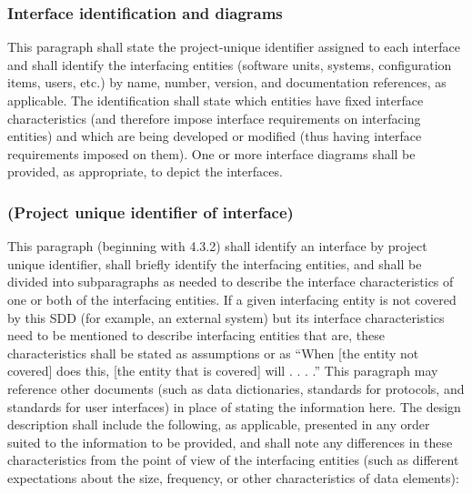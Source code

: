 \documentclass{fidata-report-template}
\begin{document}
\subsubsection{Interface identification and diagrams}

This paragraph shall state the project-unique identifier assigned to
each interface and shall identify the interfacing entities (software
units, systems, configuration items, users, etc.) by name, number,
version, and documentation references, as applicable. The identification
shall state which entities have fixed interface characteristics (and
therefore impose interface requirements on interfacing entities) and
which are being developed or modified (thus having interface
requirements imposed on them). One or more interface diagrams shall be
provided, as appropriate, to depict the interfaces.

\subsubsection{(Project unique identifier of interface)}

This paragraph (beginning with 4.3.2) shall identify an interface by
project unique identifier, shall briefly identify the interfacing
entities, and shall be divided into subparagraphs as needed to describe
the interface characteristics of one or both of the interfacing
entities. If a given interfacing entity is not covered by this SDD (for
example, an external system) but its interface characteristics need to
be mentioned to describe interfacing entities that are, these
characteristics shall be stated as assumptions or as ``When {[}the
entity not covered{]} does this, {[}the entity that is covered{]} will .
. . .'' This paragraph may reference other documents (such as data
dictionaries, standards for protocols, and standards for user
interfaces) in place of stating the information here. The design
description shall include the following, as applicable, presented in any
order suited to the information to be provided, and shall note any
differences in these characteristics from the point of view of the
interfacing entities (such as different expectations about the size,
frequency, or other characteristics of data elements):
\end{document}
